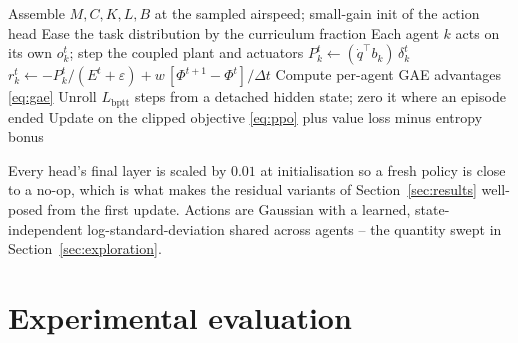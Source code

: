 \documentclass[journal]{new-aiaa}
\begin{document}
\begin{algorithm}[t]
\caption{Training with the blended (exact-plus-shaping) credit}
\label{alg:mocca}
\begin{algorithmic}[1]
\State Assemble $M,C,K,L,B$ at the sampled airspeed; small-gain init of the
action head
  \State Ease the task distribution by the curriculum fraction
    \State Each agent $k$ acts on its own $o_k^t$; step the coupled plant and
    actuators
    \State $P_k^t \gets (\dot q^\top b_k)\,\delta_k^t$
    \State $r_k^t \gets -P_k^t/(E^t+\varepsilon)
      + w\,[\Phi^{t+1}-\Phi^{t}]/\Delta t$
  \EndFor
  \State Compute per-agent GAE advantages \eqref{eq:gae}
    \State Unroll $L_{\mathrm{bptt}}$ steps from a detached hidden state; zero it
    where an episode ended
    \State Update on the clipped objective \eqref{eq:ppo} plus value loss
    minus entropy bonus
  \EndFor
\EndFor
\end{algorithmic}
\end{algorithm}

Every head's final layer is scaled by $0.01$ at
initialisation so a fresh policy is close to a no-op, which is what makes
the residual variants of Section~\ref{sec:results} well-posed from the
first update. Actions are Gaussian with a learned, state-independent
log-standard-deviation shared across agents -- the quantity swept in
Section~\ref{sec:exploration}.

\section{Experimental evaluation}
\label{sec:design}
\end{document}
